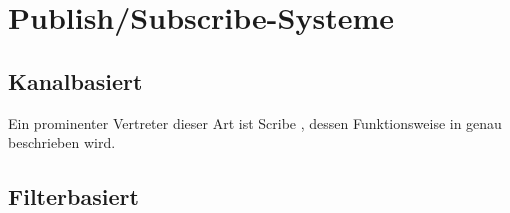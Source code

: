 \section{Publish/Subscribe-Systeme}
\label{chap:grundlagen:pubsub}

\cite{PatrickTh2003Many} %
\cite{Liu2003Survey}

\subsection{Kanalbasiert}
\label{chap:grundlagen:pubsub:kanalbasiert}
Ein prominenter Vertreter dieser Art ist Scribe \cite{Castro2002Scribe}, dessen Funktionsweise in  genau beschrieben wird.

\subsection{Filterbasiert}
\label{chap:grundlagen:pubsub:filterbased}
\cite{Bharambe2004Mercury} %

\cite{Demers2006Towards} %


